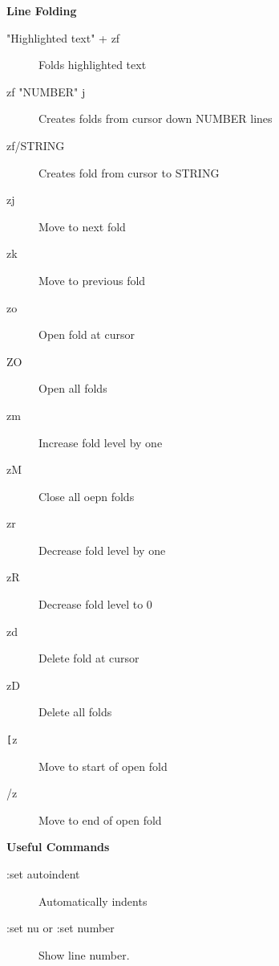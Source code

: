 \documentclass{article}
\begin{document}
\begin{multicols}{2}
\begin{center}
\Large\textbf{Line Folding}
\end{center}
\begin{description}
\item["Highlighted text" + zf] \hfill
Folds highlighted text
\item[zf "NUMBER" j] \hfill
Creates folds from cursor down NUMBER lines
\item[zf/STRING] \hfill
Creates fold from cursor to STRING
\item[zj] \hfill
Move to next fold
\item[zk] \hfill
Move to previous fold
\item[zo] \hfill
Open fold at cursor
\item[ZO] \hfill
Open all folds
\item[zm] \hfill
Increase fold level by one
\item[zM] \hfill
Close all oepn folds
\item[zr] \hfill
Decrease fold level by one
\item[zR] \hfill
Decrease fold level to 0
\item[zd] \hfill
Delete fold at cursor
\item[zD] \hfill
Delete all folds
\item[\texttt{[}z] \hfill
Move to start of open fold
\item[/z] \hfill
Move to end of open fold
\end{description}
\columnbreak
\begin{center}
\Large\textbf{Useful Commands}
\end{center}
\begin{description}
\item[:set autoindent] \hfill
Automatically indents
\item[:set nu or :set number] \hfill
Show line number.
\end{description}
\end{multicols}
\end{document}

